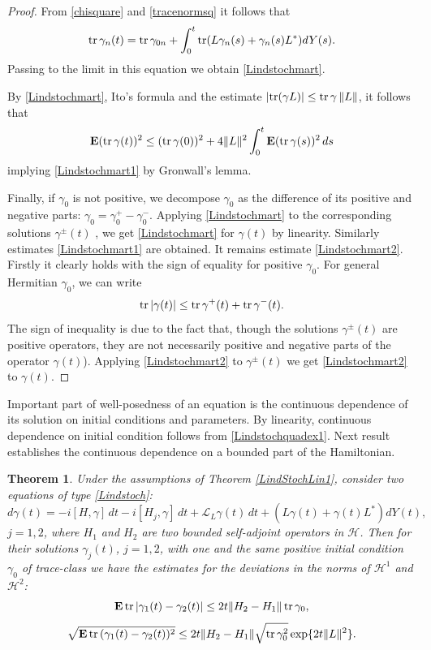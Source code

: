 \documentclass[12pt]{article}
\def\LC{\mathcal{L}}
\def\HC{\mathcal{H}}
\def\E{\mathbf{E}}
\def\tr{\rm{tr}}
\def\ga{\gamma}
\newtheorem{theorem}{Theorem}[section]
\begin{document}
\begin{proof}
From \eqref{chisquare} and \eqref{tracenormsq} it follows that
\[
{\tr} \,\ga_n(t)={\tr} \, \ga_{0n}+\int_0^t {\tr} (L\ga_n(s)+\ga_n(s) L^*) dY(s).
\]
Passing to the limit in this equation
we obtain \eqref{Lindstochmart}.

By \eqref{Lindstochmart}, Ito's formula and the estimate
$|{\tr} (\ga L)|\le {\tr}\, \ga \,  \|L\|$, it follows that
 \[
 \E ({\tr}\, \ga(t))^2
 \le  ({\tr} \, \ga(0))^2+4 \|L\|^2 \int_0^t \E ({\tr} \, \ga(s))^2\,  ds
\]
implying \eqref{Lindstochmart1} by Gronwall's lemma.

Finally, if $\ga_0$ is not positive, we decompose $\ga_0$
as the difference of its positive and negative parts:
$\ga_0=\ga_0^+-\ga_0^-$. Applying  \eqref{Lindstochmart}
 to the corresponding solutions $\ga^{\pm}(t)$ , we get  \eqref{Lindstochmart} for $\ga(t)$
by linearity. Similarly estimates \eqref{Lindstochmart1} are obtained. It remains estimate \eqref{Lindstochmart2}.
Firstly it clearly holds with the sign of equality for positive $\ga_0$. For general Hermitian $\ga_0$,
we can write
\[
{\tr} \, |\ga(t)| \le {\tr} \, \ga^+(t) +{\tr} \, \ga^-(t).
\]
The sign of inequality is due to the fact that, though the solutions $\ga^{\pm}(t)$ are positive operators,
 they are not necessarily positive and negative parts of the operator $\ga(t)$).
Applying  \eqref{Lindstochmart2} to $\ga^{\pm}(t)$ we get \eqref{Lindstochmart2} to $\ga(t)$.
 \end{proof}

Important part of well-posedness of an equation is the continuous dependence of its solution on
 initial conditions and parameters. By linearity, continuous dependence on initial condition
 follows from \eqref{Lindstochquadex1}. Next result establishes the continuous dependence on
 a bounded part of the Hamiltonian.

\begin{theorem}
\label{LindStochLin2}
Under the assumptions of Theorem \ref{LindStochLin1},
consider two equations of type \eqref{Lindstoch}:
\begin{equation}
\label{Lindstochtwo}
d\ga(t)=-i[H,\ga] \, dt -i[H_j,\ga] \, dt+\LC_L \ga(t) \, dt +(L\ga(t)+\ga(t) L^*) dY(t),
\end{equation}
$j=1,2$, where $H_1$ and $H_2$ are two bounded self-adjoint operators in $\HC$.
Then for their solutions $\ga_j(t)$, $j=1,2$, with one and the same positive initial
condition $\ga_0$ of trace-class
we have the estimates for the deviations in the norms of $\HC^1$ and $\HC^2$:
\begin{equation}
\label{eqLindstochLin21}
\E \, {\tr}\, |\ga_1(t)-\ga_2(t)|\le 2 t \|H_2-H_1\| \, {\tr} \, \ga_0,
\end{equation}
\begin{equation}
\label{eqLindstochLin22}
\sqrt{\E \, {\tr}\, (\ga_1(t)-\ga_2(t))^2}
\le 2 t \|H_2-H_1\|\sqrt{ {\tr} \, \ga_0^2} \exp\{2t \|L\|^2\}.
\end{equation}
\end{theorem}
\end{document}
